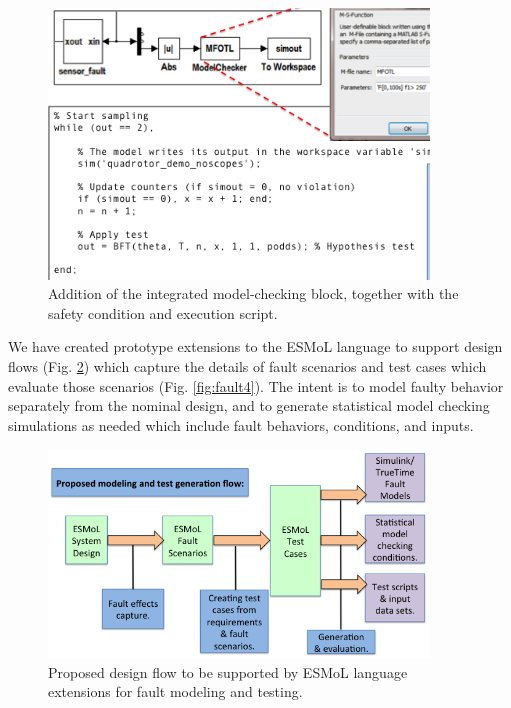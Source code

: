 \begin{figure}[thpb]
\centering
\includegraphics[width=0.9\textwidth]{img/FaultModeling2}
\caption{Addition of the integrated model-checking block, together with the safety condition and execution script.}
\label{fig:fault2}
\end{figure}

We have created prototype extensions to the ESMoL language to support design flows (Fig. \ref{fig:fault3}) which capture the details of fault scenarios and test cases which evaluate those scenarios (Fig. \ref{fig:fault4}).  The intent is to model faulty behavior separately from the nominal design, and to generate statistical model checking simulations as needed which include fault behaviors, conditions, and inputs.

\begin{figure}[thpb]
\centering
\includegraphics[width=0.9\textwidth]{img/FaultModeling3}
\caption{Proposed design flow to be supported by ESMoL language extensions for fault modeling and testing.}
\label{fig:fault3}
\end{figure}


